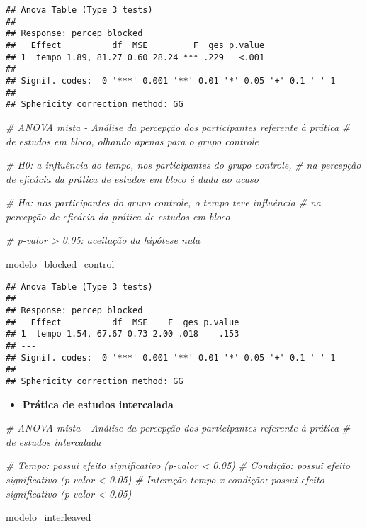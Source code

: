 \documentclass[
]{article}
\newenvironment{Shaded}{\begin{snugshade}}{\end{snugshade}}
\newcommand{\CommentTok}[1]{\textcolor[rgb]{0.56,0.35,0.01}{\textit{#1}}}
\newcommand{\NormalTok}[1]{#1}
\providecommand{\tightlist}{%
  \setlength{\itemsep}{0pt}\setlength{\parskip}{0pt}}
\begin{document}
\begin{verbatim}
## Anova Table (Type 3 tests)
## 
## Response: percep_blocked
##   Effect          df  MSE         F  ges p.value
## 1  tempo 1.89, 81.27 0.60 28.24 *** .229   <.001
## ---
## Signif. codes:  0 '***' 0.001 '**' 0.01 '*' 0.05 '+' 0.1 ' ' 1
## 
## Sphericity correction method: GG
\end{verbatim}

\begin{Shaded}
\begin{Highlighting}[]
\CommentTok{\# ANOVA mista {-} Análise da percepção dos participantes referente à prática}
\CommentTok{\# de estudos em bloco, olhando apenas para o grupo controle}

\CommentTok{\# H0: a influência do tempo, nos participantes do grupo controle,}
\CommentTok{\# na percepção de eficácia da prática de estudos em bloco é dada ao acaso}

\CommentTok{\# Ha: nos participantes do grupo controle, o tempo teve influência}
\CommentTok{\# na percepção de eficácia da prática de estudos em bloco}

\CommentTok{\# p{-}valor \textgreater{} 0.05: aceitação da hipótese nula}

\NormalTok{modelo\_blocked\_control}
\end{Highlighting}
\end{Shaded}

\begin{verbatim}
## Anova Table (Type 3 tests)
## 
## Response: percep_blocked
##   Effect          df  MSE    F  ges p.value
## 1  tempo 1.54, 67.67 0.73 2.00 .018    .153
## ---
## Signif. codes:  0 '***' 0.001 '**' 0.01 '*' 0.05 '+' 0.1 ' ' 1
## 
## Sphericity correction method: GG
\end{verbatim}

\begin{itemize}
\tightlist
\item
  \textbf{Prática de estudos intercalada}
\end{itemize}

\begin{Shaded}
\begin{Highlighting}[]
\CommentTok{\# ANOVA mista {-} Análise da percepção dos participantes referente à prática}
\CommentTok{\# de estudos intercalada}

\CommentTok{\# Tempo: possui efeito significativo (p{-}valor \textless{} 0.05)}
\CommentTok{\# Condição: possui efeito significativo (p{-}valor \textless{} 0.05)}
\CommentTok{\# Interação tempo x condição: possui efeito significativo (p{-}valor \textless{} 0.05)}

\NormalTok{modelo\_interleaved}
\end{Highlighting}
\end{Shaded}
\end{document}
